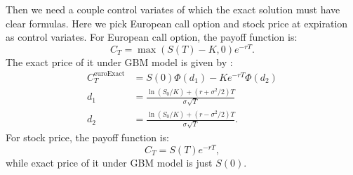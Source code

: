Then we need a couple control variates of which the exact solution must have clear formulas. 
Here we pick European call option and stock price at expiration as control variates.   
For European call option, the payoff function is: 
\[ C_{T} = \max (S(T)-K,0)e^{-rT}.\] 
The exact price of it under GBM model is given by \cite{boyle1977options}:  
\begin{align*}
    C_{T}^{\mathrm{euroExact}} &= S(0)\Phi(d_1)-Ke^{-rT}\Phi(d_2)\\
    d_1 &=\frac{\ln(S_0/K)+(r+\sigma^2/2)T}{\sigma\sqrt{T}}\\
    d_2 &=\frac{\ln(S_0/K)+(r-\sigma^2/2)T}{\sigma\sqrt{T}}.
\end{align*}
For stock price, the payoff function is: 
\[ C_{T} = S(T)e^{-rT},\] 
while exact price of it under GBM model is just $S(0)$.  

